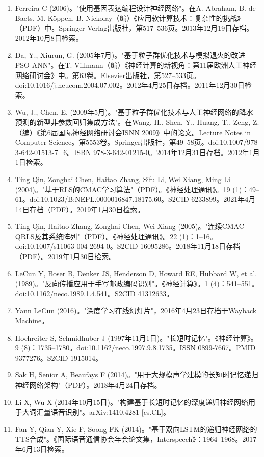 \begin{enumerate}
\item Ferreira C (2006)。"使用基因表达编程设计神经网络"。在A. Abraham, B. de Baets, M. Köppen, B. Nickolay（编）《应用软计算技术：复杂性的挑战》（PDF）中。Springer-Verlag出版社，第517–536页。2013年12月19日存档。2012年10月8日检索。
\item Da, Y., Xiurun, G. (2005年7月)。"基于粒子群优化技术与模拟退火的改进PSO-ANN"。在T. Villmann（编）《神经计算的新视角：第11届欧洲人工神经网络研讨会》中。第63卷。Elsevier出版社，第527–533页。doi:10.1016/j.neucom.2004.07.002。2012年4月25日存档。2011年12月30日检索。
\item Wu, J., Chen, E. (2009年5月)。"基于粒子群优化技术与人工神经网络的降水预测的新型非参数回归集成方法"。在Wang, H., Shen, Y., Huang, T., Zeng, Z.（编）《第6届国际神经网络研讨会ISNN 2009》中的论文。Lecture Notes in Computer Science。第5553卷。Springer出版社，第49–58页。doi:10.1007/978-3-642-01513-7_6。ISBN 978-3-642-01215-0。2014年12月31日存档。2012年1月1日检索。
\item Ting Qin, Zonghai Chen, Haitao Zhang, Sifu Li, Wei Xiang, Ming Li (2004)。"基于RLS的CMAC学习算法"（PDF）。《神经处理通讯》。19 (1)：49–61。doi:10.1023/B:NEPL.0000016847.18175.60。S2CID 6233899。2021年4月14日存档（PDF）。2019年1月30日检索。
\item Ting Qin, Haitao Zhang, Zonghai Chen, Wei Xiang (2005)。"连续CMAC-QRLS及其系统阵列"（PDF）。《神经处理通讯》。22 (1)：1–16。doi:10.1007/s11063-004-2694-0。S2CID 16095286。2018年11月18日存档（PDF）。2019年1月30日检索。
\item LeCun Y, Boser B, Denker JS, Henderson D, Howard RE, Hubbard W, et al. (1989)。"反向传播应用于手写邮政编码识别"。《神经计算》。1 (4)：541–551。doi:10.1162/neco.1989.1.4.541。S2CID 41312633。
\item Yann LeCun (2016)。"深度学习在线幻灯片"，2016年4月23日存档于Wayback Machine。
\item Hochreiter S, Schmidhuber J (1997年11月1日)。"长短时记忆"。《神经计算》。9 (8)：1735–1780。doi:10.1162/neco.1997.9.8.1735。ISSN 0899-7667。PMID 9377276。S2CID 1915014。
\item Sak H, Senior A, Beaufays F (2014)。"用于大规模声学建模的长短时记忆递归神经网络架构"（PDF）。2018年4月24日存档。
\item Li X, Wu X (2014年10月15日)。"构建基于长短时记忆的深度递归神经网络用于大词汇量语音识别"。arXiv:1410.4281 [cs.CL]。
\item Fan Y, Qian Y, Xie F, Soong FK (2014)。"基于双向LSTM的递归神经网络的TTS合成"。《国际语音通信协会年会论文集，Interspeech》：1964–1968。2017年6月13日检索。

\end{enumerate}
